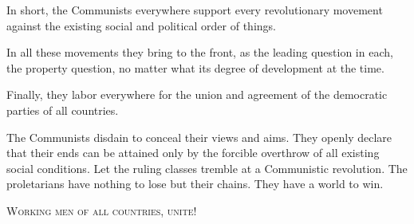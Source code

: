 In short, the Communists everywhere support every revolutionary movement against the existing social and political order of things.

In all these movements they bring to the front, as the leading question in each, the property question, no matter what its degree of development at the time.

Finally, they labor everywhere for the union and agreement of the democratic parties of all countries.

The Communists disdain to conceal their views and aims. They openly declare that their ends can be attained only by the forcible overthrow of all existing social conditions. Let the ruling classes tremble at a Communistic revolution. The proletarians have nothing to lose but their chains. They have a world to win.
\begin{center}
\textsc{Working men of all countries, unite!}
\end{center}
